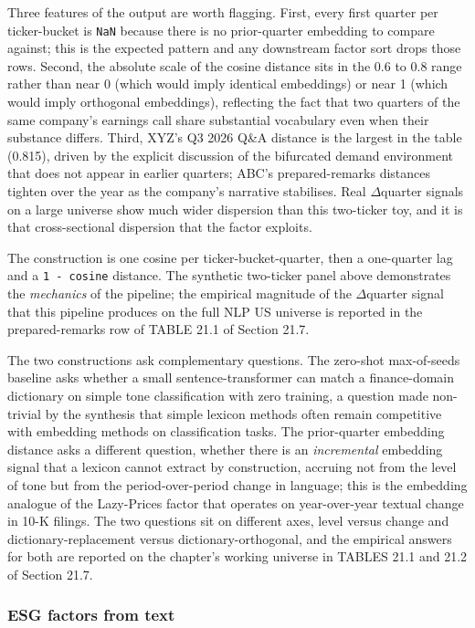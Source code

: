 Three features of the output are worth flagging. First, every first quarter per ticker-bucket is \texttt{NaN} because there is no prior-quarter embedding to compare against; this is the expected pattern and any downstream factor sort drops those rows. Second, the absolute scale of the cosine distance sits in the 0.6 to 0.8 range rather than near 0 (which would imply identical embeddings) or near 1 (which would imply orthogonal embeddings), reflecting the fact that two quarters of the same company's earnings call share substantial vocabulary even when their substance differs. Third, XYZ's Q3 2026 Q\&A distance is the largest in the table (0.815), driven by the explicit discussion of the bifurcated demand environment that does not appear in earlier quarters; ABC's prepared-remarks distances tighten over the year as the company's narrative stabilises. Real $\Delta$quarter signals on a large universe show much wider dispersion than this two-ticker toy, and it is that cross-sectional dispersion that the factor exploits.

The construction is one cosine per ticker-bucket-quarter, then a one-quarter lag and a \texttt{1 - cosine} distance. The synthetic two-ticker panel above demonstrates the \textit{mechanics} of the pipeline; the empirical magnitude of the $\Delta$quarter signal that this pipeline produces on the full NLP US universe is reported in the prepared-remarks row of TABLE 21.1 of Section 21.7.

The two constructions ask complementary questions. The zero-shot max-of-seeds baseline asks whether a small sentence-transformer can match a finance-domain dictionary on simple tone classification with zero training, a question made non-trivial by the \cite{lis2024investor} synthesis that simple lexicon methods often remain competitive with embedding methods on classification tasks. The prior-quarter embedding distance asks a different question, whether there is an \textit{incremental} embedding signal that a lexicon cannot extract by construction, accruing not from the level of tone but from the period-over-period change in language; this is the embedding analogue of the \cite{cohen2020lazy} Lazy-Prices factor that operates on year-over-year textual change in 10-K filings. The two questions sit on different axes, level versus change and dictionary-replacement versus dictionary-orthogonal, and the empirical answers for both are reported on the chapter's working universe in TABLES 21.1 and 21.2 of Section 21.7.

\subsubsection{ESG factors from text}

